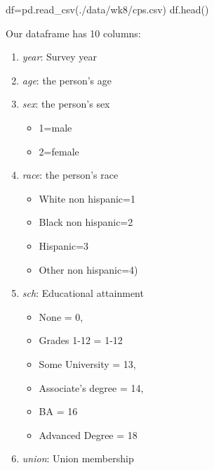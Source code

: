 \documentclass[
  letterpaper,
  DIV=11,
  numbers=noendperiod]{scrreprt}
\newenvironment{Shaded}{\begin{snugshade}}{\end{snugshade}}
\newcommand{\NormalTok}[1]{\textcolor[rgb]{0.00,0.23,0.31}{#1}}
\newcommand{\OperatorTok}[1]{\textcolor[rgb]{0.37,0.37,0.37}{#1}}
\newcommand{\StringTok}[1]{\textcolor[rgb]{0.13,0.47,0.30}{#1}}
\providecommand{\tightlist}{%
  \setlength{\itemsep}{0pt}\setlength{\parskip}{0pt}}\usepackage{longtable,booktabs,array}
\begin{document}
\begin{Shaded}
\begin{Highlighting}[]
\NormalTok{df}\OperatorTok{=}\NormalTok{pd.read\_csv(}\StringTok{\textquotesingle{}./data/wk8/cps.csv\textquotesingle{}}\NormalTok{)}
\NormalTok{df.head()}
\end{Highlighting}
\end{Shaded}

Our dataframe has 10 columns:

\begin{enumerate}
\def\labelenumi{\arabic{enumi}.}
\tightlist
\item
  \emph{year}: Survey year
\item
  \emph{age}: the person's age
\item
  \emph{sex}: the person's sex

  \begin{itemize}
  \tightlist
  \item
    1=male
  \item
    2=female
  \end{itemize}
\item
  \emph{race}: the person's race

  \begin{itemize}
  \tightlist
  \item
    White non hispanic=1
  \item
    Black non hispanic=2
  \item
    Hispanic=3
  \item
    Other non hispanic=4)
  \end{itemize}
\item
  \emph{sch}: Educational attainment

  \begin{itemize}
  \tightlist
  \item
    None = 0,
  \item
    Grades 1-12 = 1-12
  \item
    Some University = 13,
  \item
    Associate's degree = 14,
  \item
    BA = 16
  \item
    Advanced Degree = 18
  \end{itemize}
\item
  \emph{union}: Union membership


\end{enumerate}
\end{document}
